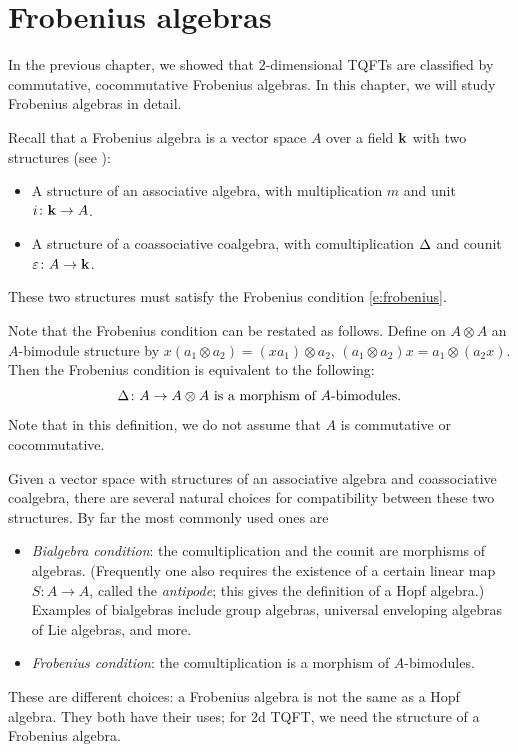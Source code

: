 \chapter{Frobenius algebras}\label{c:frobenius}


In the previous chapter, we showed that 2-dimensional TQFTs are classified
by commutative, cocommutative Frobenius algebras. In this chapter, we will study
Frobenius algebras in detail.


Recall that a Frobenius
algebra is a vector space $A$ over a field $\mathbf{k}$ with two structures (see
):
\begin{itemize}
  \item A structure of an associative algebra, with multiplication $m$ and
    unit $i\colon \mathbf{k} \to A$.
  \item A structure of a coassociative coalgebra, with comultiplication $\Delta$
    and counit $\varepsilon\colon A\to \mathbf{k}$.
\end{itemize}
These two structures must satisfy the Frobenius condition
\eqref{e:frobenius}.

Note that the Frobenius condition can be restated as follows. Define on
$A\otimes A$ an $A$-bimodule structure by $x (a_1\otimes a_2) = (xa_1)\otimes
a_2$, $(a_1\otimes a_2) x = a_1\otimes (a_2 x)$. Then the Frobenius condition
is equivalent to the following:
\begin{equation}\label{e:frobenius2}
  \Delta\colon A\to A\otimes A \text{ is a morphism of $A$-bimodules.}
\end{equation}
Note that in this definition, we do not assume that $A$ is commutative or
cocommutative.

\begin{remark}\label{r:bialgebra-vs-frobenius}
  Given a vector space with structures of an associative algebra and
  coassociative coalgebra, there are several natural choices for
  compatibility between these two structures. By far the most commonly used
  ones are
  \begin{itemize}
    \item \emph{Bialgebra condition}:
      the comultiplication and the counit are morphisms of algebras.
      (Frequently one also requires the existence of a certain linear map
      $S\colon A\to A$, called
      the \emph{antipode}; this gives the definition of a Hopf
      algebra.)
      Examples of bialgebras include group algebras, universal
      enveloping algebras of Lie algebras, and more.
    \item \emph{Frobenius condition}: the comultiplication is a morphism
      of $A$-bimodules.
  \end{itemize}
  These are different choices: a Frobenius algebra is not the same as a
  Hopf algebra. They both have their uses; for 2d TQFT, we need the
  structure of a Frobenius algebra.
\end{remark}


